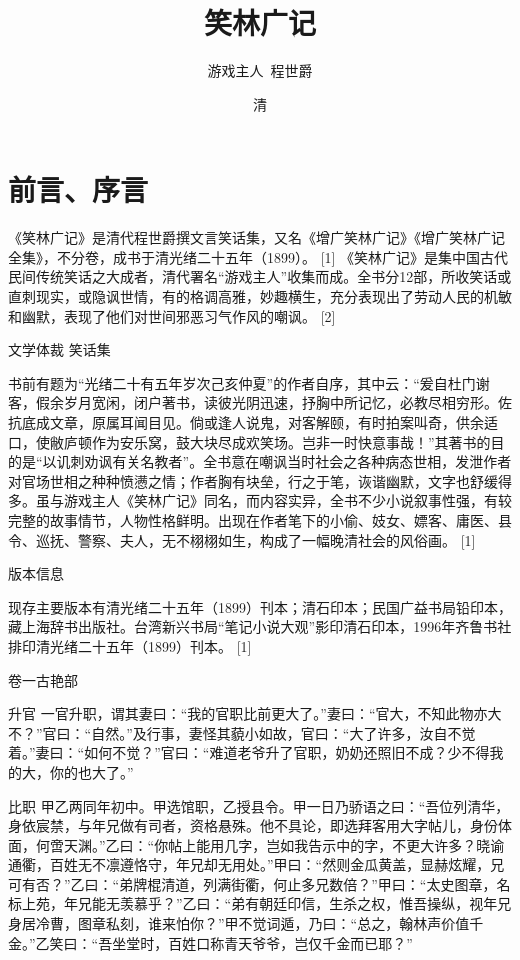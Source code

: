 \documentclass[12pt,UTF8]{ctexbook}
\title{\heiti\zihao{0} 笑林广记}
\author{游戏主人\ 程世爵}
\date{清}
\begin{document}
\maketitle
\tableofcontents

\frontmatter
\chapter{前言、序言}

《笑林广记》是清代程世爵撰文言笑话集，又名《增广笑林广记》《增广笑林广记全集》，不分卷，成书于清光绪二十五年（1899）。 [1]
《笑林广记》是集中国古代民间传统笑话之大成者，清代署名“游戏主人”收集而成。全书分12部，所收笑话或直刺现实，或隐讽世情，有的格调高雅，妙趣横生，充分表现出了劳动人民的机敏和幽默，表现了他们对世间邪恶习气作风的嘲讽。 [2]

文学体裁
笑话集

书前有题为“光绪二十有五年岁次己亥仲夏”的作者自序，其中云：“爰自杜门谢客，假余岁月宽闲，闭户著书，读彼光阴迅速，抒胸中所记忆，必教尽相穷形。佐抗底成文章，原属耳闻目见。倘或逢人说鬼，对客解颐，有时拍案叫奇，供余适口，使敝庐顿作为安乐窝，鼓大块尽成欢笑场。岂非一时快意事哉！”其著书的目的是“以讥刺劝讽有关名教者”。全书意在嘲讽当时社会之各种病态世相，发泄作者对官场世相之种种愤懑之情；作者胸有块垒，行之于笔，诙谐幽默，文字也舒缓得多。虽与游戏主人《笑林广记》同名，而内容实异，全书不少小说叙事性强，有较完整的故事情节，人物性格鲜明。出现在作者笔下的小偷、妓女、嫖客、庸医、县令、巡抚、警察、夫人，无不栩栩如生，构成了一幅晚清社会的风俗画。 [1]

版本信息

现存主要版本有清光绪二十五年（1899）刊本；清石印本；民国广益书局铅印本，藏上海辞书出版社。台湾新兴书局“笔记小说大观”影印清石印本，1996年齐鲁书社排印清光绪二十五年（1899）刊本。 [1]

\mainmatter

卷一古艳部

升官
一官升职，谓其妻曰：“我的官职比前更大了。”妻曰：“官大，不知此物亦大不？”官曰：“自然。”及行事，妻怪其藐小如故，官曰：“大了许多，汝自不觉着。”妻曰：“如何不觉？”官曰：“难道老爷升了官职，奶奶还照旧不成？少不得我的大，你的也大了。”

比职
甲乙两同年初中。甲选馆职，乙授县令。甲一日乃骄语之曰：“吾位列清华，身依宸禁，与年兄做有司者，资格悬殊。他不具论，即选拜客用大字帖儿，身份体面，何啻天渊。”乙曰：“你帖上能用几字，岂如我告示中的字，不更大许多？晓谕通衢，百姓无不凛遵恪守，年兄却无用处。”甲曰：“然则金瓜黄盖，显赫炫耀，兄可有否？”乙曰：“弟牌棍清道，列满街衢，何止多兄数倍？”甲曰：“太史图章，名标上苑，年兄能无羡慕乎？”乙曰：“弟有朝廷印信，生杀之权，惟吾操纵，视年兄身居冷曹，图章私刻，谁来怕你？”甲不觉词遁，乃曰：“总之，翰林声价值千金。”乙笑曰：“吾坐堂时，百姓口称青天爷爷，岂仅千金而已耶？”
\end{document}
